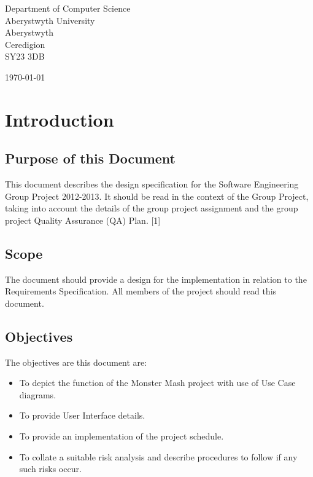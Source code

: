 \documentclass[a4paper]{article}
\begin{document}
\begin{center}
\begin{minipage}{0.8\textwidth}
\begin{flushleft} \large
Department of Computer Science\\
Aberystwyth University\\
Aberystwyth\\
Ceredigion\\
SY23 3DB\\
\end{flushleft}
\end{minipage}
\vfill
{\large \today}
\end{center}
\clearpage
\setlength\parindent{0pt}


\tableofcontents
\clearpage


\section{Introduction}

\subsection{Purpose of this Document}

This document describes the design specification for the Software Engineering Group Project 2012-2013. It should be read in the context of the Group Project, taking into account the details of the group project assignment and the group project Quality Assurance (QA) Plan. [1]

\subsection{Scope}

The document should provide a design for the implementation in relation to the Requirements Specification. All members of the project should read this document.

\subsection{Objectives}

The objectives are this document are:

\begin{itemize}
\item To depict the function of the Monster Mash project with use of Use Case diagrams.
\item To provide User Interface details.
\item To provide an implementation of the project schedule.
\item To collate a suitable risk analysis and describe procedures to follow if any such risks occur.
\end{itemize}
\clearpage
\end{document}
